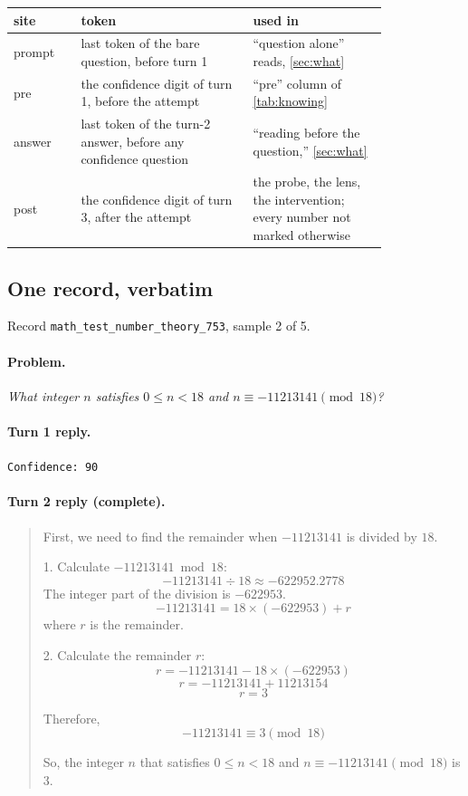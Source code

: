 \begin{table}[H]
\centering\small
\begin{tabular}{@{}lp{0.46\linewidth}p{0.36\linewidth}@{}}
\toprule
\textbf{site} & \textbf{token} & \textbf{used in} \\
\midrule
prompt & last token of the bare question, before turn 1 & ``question alone'' reads, \cref{sec:what} \\
pre & the confidence digit of turn 1, before the attempt & ``pre'' column of \cref{tab:knowing} \\
answer & last token of the turn-2 answer, before any confidence question & ``reading before the question,'' \cref{sec:what} \\
post & the confidence digit of turn 3, after the attempt & the probe, the lens, the intervention; every number not marked otherwise \\
\bottomrule
\end{tabular}
\end{table}

\subsection{One record, verbatim}

Record \texttt{math\_test\_number\_theory\_753}, sample 2 of 5.

\paragraph{Problem.} \emph{What integer $n$ satisfies $0 \le n < 18$ and $n \equiv -11213141 \pmod{18}$?}

\paragraph{Turn 1 reply.} \texttt{Confidence: 90}

\paragraph{Turn 2 reply (complete).}
\begin{quote}\footnotesize
First, we need to find the remainder when $-11213141$ is divided by $18$.

1. Calculate $-11213141 \bmod 18$:
\[ -11213141 \div 18 \approx -622952.2778 \]
The integer part of the division is $-622953$.
\[ -11213141 = 18 \times (-622953) + r \]
where $r$ is the remainder.

2. Calculate the remainder $r$:
\[ r = -11213141 - 18 \times (-622953) \]
\[ r = -11213141 + 11213154 \]
\[ r = 3 \]

Therefore,
\[ -11213141 \equiv 3 \pmod{18} \]

So, the integer $n$ that satisfies $0 \le n < 18$ and $n \equiv -11213141 \pmod{18}$ is $3$.
\end{quote}

